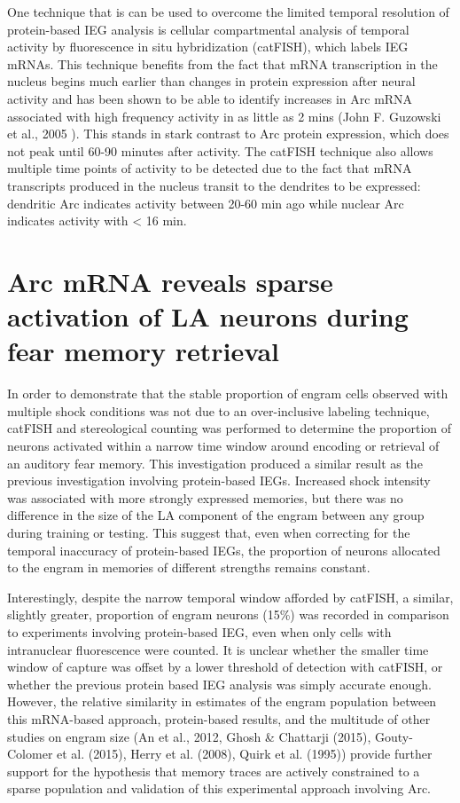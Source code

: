 \documentclass[12pt,a4paperpaper,]{report}
\begin{document}
One technique that is can be used to overcome the limited temporal
resolution of protein-based IEG analysis is cellular compartmental
analysis of temporal activity by fluorescence in situ hybridization
(catFISH), which labels IEG mRNAs. This technique benefits from the fact
that mRNA transcription in the nucleus begins much earlier than changes
in protein expression after neural activity and has been shown to be
able to identify increases in Arc mRNA associated with high frequency
activity in as little as 2 mins (John F. Guzowski et al., 2005 ). This
stands in stark contrast to Arc protein expression, which does not peak
until 60-90 minutes after activity. The catFISH technique also allows
multiple time points of activity to be detected due to the fact that
mRNA transcripts produced in the nucleus transit to the dendrites to be
expressed: dendritic Arc indicates activity between 20-60 min ago while
nuclear Arc indicates activity with \textless{} 16 min.

\section{Arc mRNA reveals sparse activation of LA neurons during fear
memory
retrieval}\label{arc-mrna-reveals-sparse-activation-of-la-neurons-during-fear-memory-retrieval}

In order to demonstrate that the stable proportion of engram cells
observed with multiple shock conditions was not due to an over-inclusive
labeling technique, catFISH and stereological counting was performed to
determine the proportion of neurons activated within a narrow time
window around encoding or retrieval of an auditory fear memory. This
investigation produced a similar result as the previous investigation
involving protein-based IEGs. Increased shock intensity was associated
with more strongly expressed memories, but there was no difference in
the size of the LA component of the engram between any group during
training or testing. This suggest that, even when correcting for the
temporal inaccuracy of protein-based IEGs, the proportion of neurons
allocated to the engram in memories of different strengths remains
constant.

Interestingly, despite the narrow temporal window afforded by catFISH, a
similar, slightly greater, proportion of engram neurons (15\%) was
recorded in comparison to experiments involving protein-based IEG, even
when only cells with intranuclear fluorescence were counted. It is
unclear whether the smaller time window of capture was offset by a lower
threshold of detection with catFISH, or whether the previous protein
based IEG analysis was simply accurate enough. However, the relative
similarity in estimates of the engram population between this mRNA-based
approach, protein-based results, and the multitude of other studies on
engram size (An et al., 2012, Ghosh \& Chattarji (2015), Gouty-Colomer
et al. (2015), Herry et al. (2008), Quirk et al. (1995)) provide further
support for the hypothesis that memory traces are actively constrained
to a sparse population and validation of this experimental approach
involving Arc.
\end{document}
